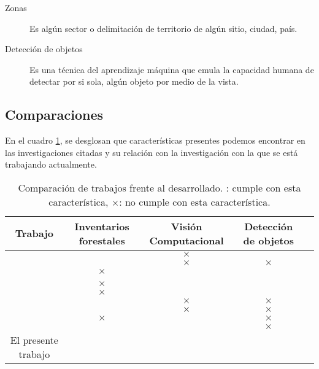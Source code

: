 \begin{description}
\item[Zonas]{Es algún sector o delimitación de territorio de algún sitio, ciudad, país.}
\end{description}

\begin{description}
\item[Detección de objetos]{Es una técnica del aprendizaje máquina que emula la capacidad humana de detectar por si sola, algún objeto por medio de la vista.}
\end{description}

\newpage

\subsection{Comparaciones}
En el cuadro \ref{tab:Comparación de trabajos frente al desarrollado}, se desglosan que características presentes podemos encontrar en las investigaciones citadas y su relación con la investigación con la que se está trabajando actualmente.\\
\renewcommand{\tablename}{Cuadro}
\begin{table}[hbt!]
	{\centering
	\caption{Comparación de trabajos frente al desarrollado. \checkmark: cumple con esta característica, $\times$: no cumple con esta característica.}
	\begin{adjustbox}{width=\textwidth}
		\begin{tabular}{|c|c|c|c|c|}
			\hline
			Trabajo &  Inventarios forestales &  Visión Computacional & Detección de objetos\\
			\hline
			\citet{rf1} & \checkmark & $\times$ & \checkmark \\
			\hline
			\citet{rf2}&  \checkmark  &  $\times$ & $\times$  \\
			\hline
			\citet{rf3}& $\times$ & \checkmark & \checkmark  \\
			\hline	
			\citet{rf9}& \checkmark & \checkmark & \checkmark  \\
			\hline
			\citet{rf10}& $\times$ & \checkmark & \checkmark  \\
			\hline
			\citet{rf11}& $\times$ & \checkmark & \checkmark  \\
			\hline
			\citet{rf12}& \checkmark  & $\times$ & $\times$  \\
			\hline
			\citet{rf13}& \checkmark & $\times$ & $\times$  \\
			\hline
			\citet{rf14}&  $\times$ & \checkmark & $\times$   \\
			\hline
			\citet{rf15}& \checkmark & \checkmark & $\times$  \\
			\hline
			El presente trabajo & \checkmark & \checkmark & \checkmark \\
			\hline
		\end{tabular}
	\end{adjustbox}
	\label{tab:Comparación de trabajos frente al desarrollado}}
\end{table}

